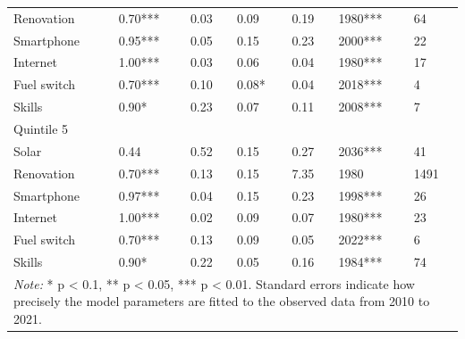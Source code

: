 \begin{tabular}{l{2cm}p{1cm}p{1cm}p{1cm}p{1cm}p{1cm}p{1cm}}
Renovation & 0.70*** & 0.03 & 0.09 & 0.19 & 1980*** & 64 \\
Smartphone & 0.95*** & 0.05 & 0.15 & 0.23 & 2000*** & 22 \\
Internet & 1.00*** & 0.03 & 0.06 & 0.04 & 1980*** & 17 \\
Fuel switch & 0.70*** & 0.10 & 0.08* & 0.04 & 2018*** & 4 \\
Skills & 0.90* & 0.23 & 0.07 & 0.11 & 2008*** & 7 \\\midrule 
Quintile 5& & & & & & \\ \midrule
Solar & 0.44 & 0.52 & 0.15 & 0.27 & 2036*** & 41 \\
Renovation & 0.70*** & 0.13 & 0.15 & 7.35 & 1980 & 1491 \\
Smartphone & 0.97*** & 0.04 & 0.15 & 0.23 & 1998*** & 26 \\
Internet & 1.00*** & 0.02 & 0.09 & 0.07 & 1980*** & 23 \\
Fuel switch & 0.70*** & 0.13 & 0.09 & 0.05 & 2022*** & 6 \\
Skills & 0.90* & 0.22 & 0.05 & 0.16 & 1984*** & 74 \\
          \bottomrule 
          \multicolumn{7}{p{10cm}}{\footnotesize \textit{Note:} * p < 0.1, ** p < 0.05, *** p < 0.01. Standard errors indicate how precisely the model parameters are fitted to the observed data from 2010 to 2021.}
          \end{tabular}